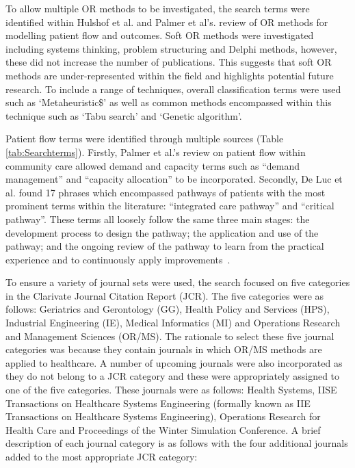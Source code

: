 \documentclass[../thesis.tex]{subfiles}
\begin{document}
To allow multiple OR methods to be investigated, the search terms were identified within Hulshof et al. \cite{PHulshof} and Palmer et al's. \cite{RPalmer} review of OR methods for modelling patient flow and outcomes. Soft OR methods were investigated including systems thinking, problem structuring and Delphi methods, however, these did not increase the number of publications. This suggests that soft OR methods are under-represented within the field and highlights potential future research. To include a range of techniques, overall classification terms were used such as `Metaheuristic\$' as well as common methods encompassed within this technique such as `Tabu search' and `Genetic algorithm'.

Patient flow terms were identified through multiple sources (Table \ref{tab:Searchterms}). Firstly, Palmer et al.'s \cite{RPalmer} review on patient flow within community care allowed demand and capacity terms such as ``demand management'' and ``capacity allocation'' to be incorporated. Secondly, De Luc et al. \cite{DLuc} found 17 phrases which encompassed pathways of patients with the most prominent terms within the literature: ``integrated care pathway'' and ``critical pathway''. These terms all loosely follow the same three main stages: the development process to design the pathway; the application and use of the pathway; and the ongoing review of the pathway to learn from the practical experience and to continuously apply improvements~\cite{DLuc, DKitchiner}. 


To ensure a variety of journal sets were used, the search focused on five categories in the Clarivate Journal Citation Report (JCR). The five categories were as follows: Geriatrics and Gerontology (GG), Health Policy and Services (HPS), Industrial Engineering (IE), Medical Informatics (MI) and Operations Research and Management Sciences (OR/MS). The rationale to select these five journal categories was because they contain journals in which OR/MS methods are applied to healthcare. A number of upcoming journals were also incorporated as they do not belong to a JCR category and these were appropriately assigned to one of the five categories. These journals were as follows: Health Systems, IISE Transactions on Healthcare Systems Engineering (formally known as IIE Transactions on Healthcare Systems Engineering), Operations Research for Health Care and Proceedings of the Winter Simulation Conference. A brief description of each journal category is as follows with the four additional journals added to the most appropriate JCR category:
\end{document}
